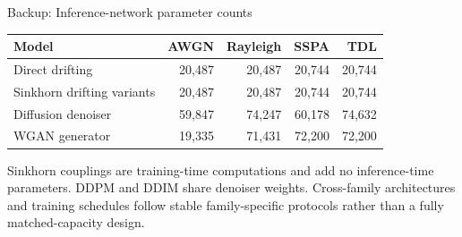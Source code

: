 \documentclass[english,xcolor=dvipsnames,aspectratio=169,10pt]{beamer}
\begin{document}
\begin{frame}{Backup: Inference-network parameter counts}
\scriptsize
\centering
\renewcommand{\arraystretch}{1.3}
\begin{tabular}{lrrrr}
\toprule
Model & AWGN & Rayleigh & SSPA & TDL\\
\midrule
Direct drifting & 20,487 & 20,487 & 20,744 & 20,744\\
Sinkhorn drifting variants & 20,487 & 20,487 & 20,744 & 20,744\\
Diffusion denoiser & 59,847 & 74,247 & 60,178 & 74,632\\
WGAN generator & 19,335 & 71,431 & 72,200 & 72,200\\
\bottomrule
\end{tabular}
\vspace{0.55cm}
\begin{minipage}{0.9\textwidth}
\small Sinkhorn couplings are training-time computations and add no inference-time parameters. DDPM and DDIM share denoiser weights. Cross-family architectures and training schedules follow stable family-specific protocols rather than a fully matched-capacity design.
\end{minipage}
\end{frame}
\end{document}
